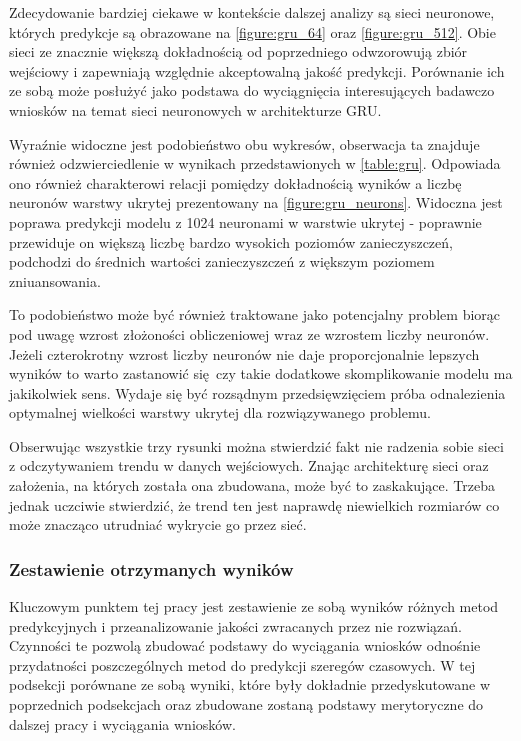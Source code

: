 \documentclass[10pt,a4paper]{article}
\begin{document}
Zdecydowanie bardziej ciekawe w kontekście dalszej analizy są sieci neuronowe, których predykcje są obrazowane na \autoref{figure:gru_64} oraz \autoref{figure:gru_512}. Obie sieci ze znacznie większą dokładnością od poprzedniego odwzorowują zbiór wejściowy i zapewniają względnie akceptowalną jakość predykcji. Porównanie ich ze sobą może posłużyć jako podstawa do wyciągnięcia interesujących badawczo wniosków na temat sieci neuronowych w architekturze GRU. 

Wyraźnie widoczne jest podobieństwo obu wykresów, obserwacja ta znajduje również odzwierciedlenie w wynikach przedstawionych w \autoref{table:gru}. Odpowiada ono również charakterowi relacji pomiędzy dokładnością wyników a liczbę neuronów warstwy ukrytej prezentowany na \autoref{figure:gru_neurons}. Widoczna jest poprawa predykcji modelu z 1024 neuronami w warstwie ukrytej - poprawnie przewiduje on większą liczbę bardzo wysokich poziomów zanieczyszczeń, podchodzi do średnich wartości zanieczyszczeń z większym poziomem zniuansowania.

To podobieństwo może być również traktowane jako potencjalny problem biorąc pod uwagę wzrost złożoności obliczeniowej wraz ze wzrostem liczby neuronów. Jeżeli czterokrotny wzrost liczby neuronów nie daje proporcjonalnie lepszych wyników to warto zastanowić się czy takie dodatkowe skomplikowanie modelu ma jakikolwiek sens. Wydaje się być rozsądnym przedsięwzięciem próba odnalezienia optymalnej wielkości warstwy ukrytej dla rozwiązywanego problemu. 

Obserwując wszystkie trzy rysunki można stwierdzić fakt nie radzenia sobie sieci z odczytywaniem trendu w danych wejściowych. Znając architekturę sieci oraz założenia, na których została ona zbudowana, może być to zaskakujące. Trzeba jednak uczciwie stwierdzić, że trend ten jest naprawdę niewielkich rozmiarów co może znacząco utrudniać wykrycie go przez sieć. 

\subsubsection{Zestawienie otrzymanych wyników}
Kluczowym punktem tej pracy jest zestawienie ze sobą wyników różnych metod predykcyjnych i przeanalizowanie jakości zwracanych przez nie rozwiązań. Czynności te pozwolą zbudować podstawy do wyciągania wniosków odnośnie przydatności poszczególnych metod do predykcji szeregów czasowych. W tej podsekcji porównane ze sobą wyniki, które były dokładnie przedyskutowane w poprzednich podsekcjach oraz zbudowane zostaną podstawy merytoryczne do dalszej pracy i wyciągania wniosków. 
\end{document}
